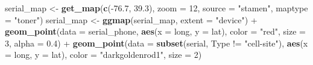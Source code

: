 \documentclass[]{book}
\makeatletter
\newenvironment{Shaded}{\begin{snugshade}}{\end{snugshade}}
\newcommand{\KeywordTok}[1]{\textcolor[rgb]{0.13,0.29,0.53}{\textbf{{#1}}}}
\newcommand{\DataTypeTok}[1]{\textcolor[rgb]{0.13,0.29,0.53}{{#1}}}
\newcommand{\DecValTok}[1]{\textcolor[rgb]{0.00,0.00,0.81}{{#1}}}
\newcommand{\FloatTok}[1]{\textcolor[rgb]{0.00,0.00,0.81}{{#1}}}
\newcommand{\StringTok}[1]{\textcolor[rgb]{0.31,0.60,0.02}{{#1}}}
\newcommand{\NormalTok}[1]{{#1}}
\newenvironment{kframe}{%
\medskip{}
\setlength{\fboxsep}{.8em}
 \def\at@end@of@kframe{}%
 \ifinner\ifhmode%
  \def\at@end@of@kframe{\end{minipage}}%
  \begin{minipage}{\columnwidth}%
 \fi\fi%
 \def\FrameCommand##1{\hskip\@totalleftmargin \hskip-\fboxsep
 \colorbox{shadecolor}{##1}\hskip-\fboxsep
     \hskip-\linewidth \hskip-\@totalleftmargin \hskip\columnwidth}%
 \MakeFramed {\advance\hsize-\width
   \@totalleftmargin\z@ \linewidth\hsize
   \@setminipage}}%
 {\par\unskip\endMakeFramed%
 \at@end@of@kframe}
\renewenvironment{Shaded}{\begin{kframe}}{\end{kframe}}
\makeatother
\begin{document}
\begin{Shaded}
\end{Shaded}

\begin{Shaded}
\begin{Highlighting}[]
\NormalTok{serial_map <-}\StringTok{ }\KeywordTok{get_map}\NormalTok{(}\KeywordTok{c}\NormalTok{(-}\FloatTok{76.7}\NormalTok{, }\FloatTok{39.3}\NormalTok{), }\DataTypeTok{zoom =} \DecValTok{12}\NormalTok{,}
                      \DataTypeTok{source =} \StringTok{"stamen"}\NormalTok{,}
                      \DataTypeTok{maptype =} \StringTok{"toner"}\NormalTok{)}
\NormalTok{serial_map <-}\StringTok{ }\KeywordTok{ggmap}\NormalTok{(serial_map, }\DataTypeTok{extent =} \StringTok{"device"}\NormalTok{) +}\StringTok{ }
\StringTok{        }\KeywordTok{geom_point}\NormalTok{(}\DataTypeTok{data =} \NormalTok{serial_phone,}
                   \KeywordTok{aes}\NormalTok{(}\DataTypeTok{x =} \NormalTok{long, }\DataTypeTok{y =} \NormalTok{lat),}
                   \DataTypeTok{color =} \StringTok{"red"}\NormalTok{, }\DataTypeTok{size =} \DecValTok{3}\NormalTok{,}
                   \DataTypeTok{alpha =} \FloatTok{0.4}\NormalTok{) +}
\StringTok{        }\KeywordTok{geom_point}\NormalTok{(}\DataTypeTok{data =} \KeywordTok{subset}\NormalTok{(serial,}
                                 \NormalTok{Type !=}\StringTok{ "cell-site"}\NormalTok{),}
                   \KeywordTok{aes}\NormalTok{(}\DataTypeTok{x =} \NormalTok{long, }\DataTypeTok{y =} \NormalTok{lat),}
                   \DataTypeTok{color =} \StringTok{"darkgoldenrod1"}\NormalTok{,}
                   \DataTypeTok{size =} \DecValTok{2}\NormalTok{)}
\end{Highlighting}
\end{Shaded}
\end{document}
